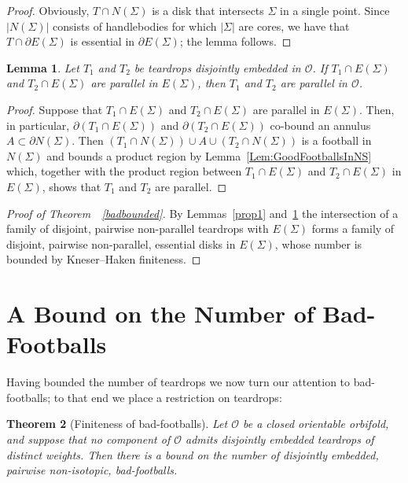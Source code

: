 \documentclass[12pt,reqno]{amsart}
\theoremstyle{plain}
\theoremstyle{definition}
\numberwithin{subcase}{case}
\theoremstyle{plain}
\newtheorem{thm}{Theorem}[section]  %
\newtheorem{lemm}[thm]{Lemma}
\theoremstyle{definition}
\newcommand{\OO}{\mathcal{O}}
\begin{document}
\begin{proof}
Obviously, \(T \cap N(\Sigma)\) is a disk that intersects \(\Sigma\) in a single point. 
Since \(|N(\Sigma)|\) consists of handlebodies for which \(|\Sigma|\) are cores, we have that 
\(T\cap \partial E(\Sigma)\) is essential in \(\partial E(\Sigma)\); the lemma follows.
\end{proof}

\begin{lemm}
Let $T_1$ and $T_2$ be teardrops disjointly embedded in $\OO$.
If $T_1 \cap E(\Sigma)$ and $T_2  \cap E(\Sigma)$ are parallel in $E(\Sigma)$, then $T_1$ and $T_2$ are parallel in $\OO$.
\label{teardropparallel}
\end{lemm}

\begin{proof}
Suppose that $T_1 \cap E(\Sigma)$ and $T_2  \cap E(\Sigma)$ are parallel in $E(\Sigma)$.  Then, in particular, $\partial (T_1 \cap E(\Sigma))$ and $\partial (T_2 \cap E(\Sigma))$ co-bound an annulus \(A \subset \partial N(\Sigma)\).  Then \(\left(T_1 \cap N(\Sigma)\right) \cup A \cup \left(T_2 \cap N(\Sigma)\right)\) is a football in \(N(\Sigma)\) and bounds a product region by Lemma~\ref{Lem:GoodFootballsInNS} which, together with the product region between $T_1 \cap E(\Sigma)$ and $T_2  \cap E(\Sigma)$ in $E(\Sigma)$, shows that \(T_{1}\) and \(T_{2}\) are parallel.
\end{proof}


\begin{proof}[Proof of Theorem~~\ref{badbounded}]
By Lemmas~\ref{prop1} and~\ref{teardropparallel} the intersection of a family of disjoint, pairwise non-parallel teardrops with \(E(\Sigma)\) forms a family of disjoint, pairwise non-parallel, essential disks in \(E(\Sigma)\), whose number is bounded by Kneser--Haken finiteness. 
\end{proof}


\section{A Bound on the Number of Bad-Footballs}\label{sec:Bad-Footballs are Bounded}

Having bounded the number of teardrops we now turn our attention to bad-footballs; to that end we place a restriction on teardrops:

\begin{thm}[Finiteness of bad-footballs]
\label{thm:Finiteness_of_bad_footballs}
Let \(\OO\) be a closed orientable orbifold, and suppose that no component of \(\OO\) admits disjointly embedded teardrops 
of distinct weights. 
Then there is a bound on the number of disjointly embedded, pairwise non-isotopic, bad-footballs. 
\end{thm}
\end{document}

